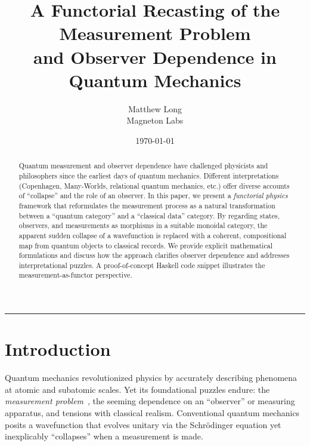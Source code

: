 \documentclass[12pt]{article}
\title{\bf A Functorial Recasting of the Measurement Problem \\
and Observer Dependence in Quantum Mechanics}
\author{Matthew Long \\
Magneton Labs}
\date{\today}
\begin{document}
\maketitle

\begin{abstract}
Quantum measurement and observer dependence have challenged physicists and philosophers since the earliest days of quantum mechanics. 
Different interpretations (Copenhagen, Many-Worlds, relational quantum mechanics, etc.) offer diverse accounts of ``collapse'' 
and the role of an observer. In this paper, we present a \emph{functorial physics} framework that reformulates the measurement process 
as a natural transformation between a ``quantum category'' and a ``classical data'' category. By regarding states, observers, 
and measurements as morphisms in a suitable monoidal category, the apparent sudden collapse of a wavefunction is replaced 
with a coherent, compositional map from quantum objects to classical records. We provide explicit mathematical formulations 
and discuss how the approach clarifies observer dependence and addresses interpretational puzzles. A proof-of-concept Haskell code snippet 
illustrates the measurement-as-functor perspective.
\end{abstract}

\hrule
\vspace{1em}

\section{Introduction}
Quantum mechanics revolutionized physics by accurately describing phenomena at atomic and subatomic scales. Yet its 
foundational puzzles endure: the \emph{measurement problem}~\cite{VonNeumann1955, WheelerZurek}, the seeming dependence on 
an ``observer'' or measuring apparatus, and tensions with classical realism. Conventional quantum mechanics 
posits a wavefunction that evolves unitary via the Schr\"odinger equation yet inexplicably ``collapses'' 
when a measurement is made.
\end{document}
